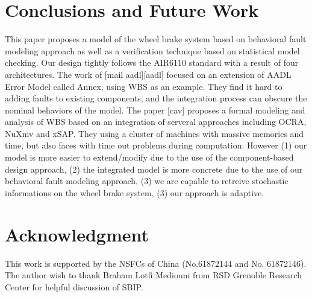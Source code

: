 \documentclass[conference]{IEEEtran}
\begin{document}















\section{Conclusions and Future Work}
This paper proposes a model of the wheel brake system based on behavioral fault modeling approach as well as a verification technique based on statistical model checking. Our design tightly follows the AIR6110 standard with a result of four architectures. The work of [mail aadl][aadl] focused on an extension of AADL Error Model called Annex, using WBS as an example. They find it hard to adding faults to existing components, and the integration process can obscure the nominal behaviors of the model. The paper [cav] proposes a formal modeling and analysis of WBS based on an integration of serveral approaches including OCRA, NuXmv and xSAP. They using a cluster of machines with massive memories and time, but also faces with time out problems during computation. However (1) our model is more easier to extend/modify due to the use of the component-based design approach, (2) the integrated model is more concrete due to the use of our behavioral fault modeling approach, (3) we are capable to retreive stochastic informations on the wheel brake system, (3) our approach is adaptive.

\section*{Acknowledgment}

This work is supported by the NSFCs of China (No.61872144 and No. 61872146). The author wish to thank Braham Lotfi Mediouni from RSD Grenoble Research Center for helpful discussion of SBIP.



\end{document}
